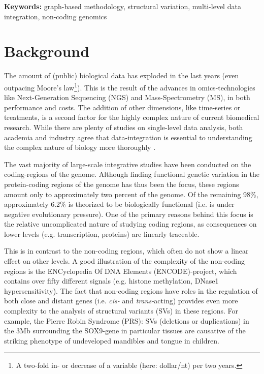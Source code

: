 \documentclass[twoside,fontsize=12pt]{article}
\begin{document}
\noindent \textbf{Keywords:} graph-based methodology, structural variation, multi-level data integration, non-coding genomics

\newpage

\section*{Background}
The amount of (public) biological data has exploded in the last years (even outpacing Moore's law\footnote{A two-fold in- or decrease of a variable (here: dollar/nt) per two years.}). This is the result of the advances in omics-technologies like Next-Generation Sequencing (NGS) and Mass-Spectrometry (MS), in both performance and costs. The addition of other dimensions, like time-series or treatments, is a second factor for the highly complex nature of current biomedical research. While there are plenty of studies on single-level data analysis, both academia and industry agree that data-integration is essential to understanding the complex nature of biology more thoroughly \citep{Gomez-Cabrero2014, Huttenhower2010, Searls2005, Hamid2009}. 

The vast majority of large-scale integrative studies have been conducted on the coding-regions of the genome\cite{ENCODE}. Although finding functional genetic variation in the protein-coding regions of the genome has thus been the focus, these regions amount only to approximately two percent of the genome\cite{Lander2001}. Of the remaining 98\%, approximately 6.2\% is theorized to be biologically functional (i.e. is under negative evolutionary pressure)\cite{Rands2014}. One of the primary reasons behind this focus is the relative uncomplicated nature of studying coding regions, as consequences on lower levels (e.g. transcription, proteins) are linearly traceable\cite{McLaren2010}. 

This is in contrast to the non-coding regions, which often do not show a linear effect on other levels\cite{Bird2006}. A good illustration of the complexity of the non-coding regions is the ENCyclopedia Of DNA Elements (ENCODE)-project\cite{ENCODE}, which contains over fifty different signals (e.g. histone methylation, DNase1 hypersensitivity). The fact that non-coding regions have roles in the regulation of both close and distant genes (i.e. \textit{cis-} and \textit{trans-}acting) provides even more complexity to the analysis of structural variants (SVs) in these regions. For example, the Pierre Robin Syndrome (PRS): SVs (deletions or duplications) in the 3Mb surrounding the SOX9-gene in particular tissues are causative of the striking phenotype of undeveloped mandibles and tongue in children\cite{Benko2009,Kurth2009}. 
\medskip
\end{document}

